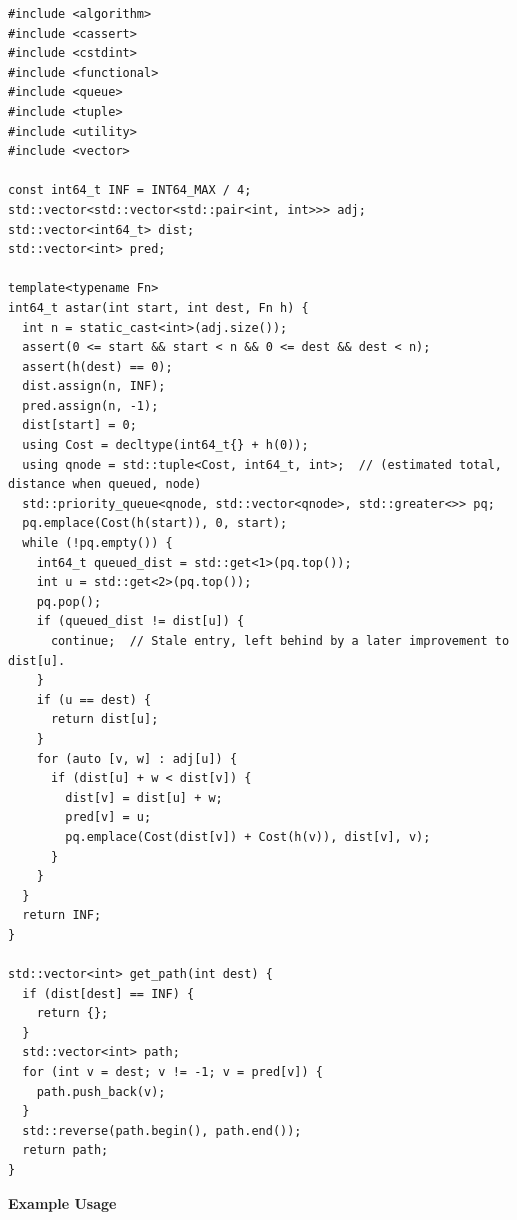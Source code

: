 \begin{lstlisting}[style=cpp]
#include <algorithm>
#include <cassert>
#include <cstdint>
#include <functional>
#include <queue>
#include <tuple>
#include <utility>
#include <vector>

const int64_t INF = INT64_MAX / 4;
std::vector<std::vector<std::pair<int, int>>> adj;
std::vector<int64_t> dist;
std::vector<int> pred;

template<typename Fn>
int64_t astar(int start, int dest, Fn h) {
  int n = static_cast<int>(adj.size());
  assert(0 <= start && start < n && 0 <= dest && dest < n);
  assert(h(dest) == 0);
  dist.assign(n, INF);
  pred.assign(n, -1);
  dist[start] = 0;
  using Cost = decltype(int64_t{} + h(0));
  using qnode = std::tuple<Cost, int64_t, int>;  // (estimated total, distance when queued, node)
  std::priority_queue<qnode, std::vector<qnode>, std::greater<>> pq;
  pq.emplace(Cost(h(start)), 0, start);
  while (!pq.empty()) {
    int64_t queued_dist = std::get<1>(pq.top());
    int u = std::get<2>(pq.top());
    pq.pop();
    if (queued_dist != dist[u]) {
      continue;  // Stale entry, left behind by a later improvement to dist[u].
    }
    if (u == dest) {
      return dist[u];
    }
    for (auto [v, w] : adj[u]) {
      if (dist[u] + w < dist[v]) {
        dist[v] = dist[u] + w;
        pred[v] = u;
        pq.emplace(Cost(dist[v]) + Cost(h(v)), dist[v], v);
      }
    }
  }
  return INF;
}

std::vector<int> get_path(int dest) {
  if (dist[dest] == INF) {
    return {};
  }
  std::vector<int> path;
  for (int v = dest; v != -1; v = pred[v]) {
    path.push_back(v);
  }
  std::reverse(path.begin(), path.end());
  return path;
}
\end{lstlisting}
\textbf{Example Usage}\par
